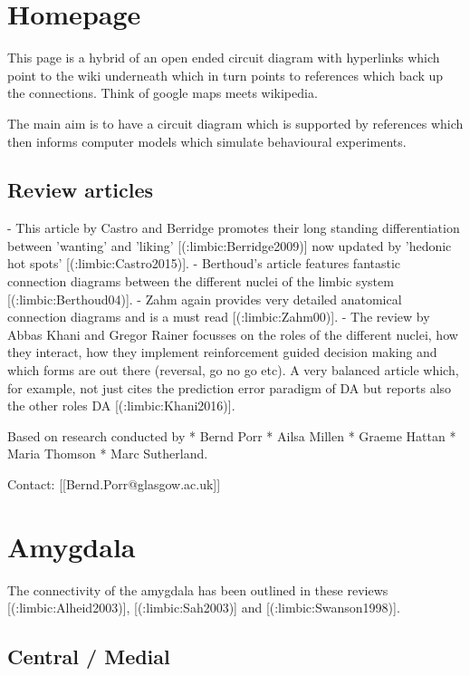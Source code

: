 \section{Homepage}

This page is a hybrid of an open ended circuit diagram with hyperlinks which point to the wiki underneath which in turn points to references which back up the connections. Think of google maps meets wikipedia.

The main aim is to have a circuit diagram which is supported by references which then informs computer models which simulate behavioural experiments.





\subsection{Review articles}
  - This article by Castro and Berridge promotes their long standing differentiation between 'wanting' and 'liking' [(:limbic:Berridge2009)] now updated by 'hedonic hot spots' [(:limbic:Castro2015)].
  - Berthoud's article features fantastic connection diagrams between the different nuclei of the limbic system [(:limbic:Berthoud04)].
  - Zahm again provides very detailed anatomical connection diagrams and is a must read [(:limbic:Zahm00)].
  - The review by  Abbas Khani and Gregor Rainer focusses on the roles of the different nuclei, how they interact, how they implement reinforcement guided decision making and which forms are out there (reversal, go no go etc). A very balanced article which, for example, not just cites the prediction error paradigm of DA but reports also the other roles DA [(:limbic:Khani2016)].

Based on research conducted by 
  * Bernd Porr
  * Ailsa Millen
  * Graeme Hattan
  * Maria Thomson
  * Marc Sutherland.

Contact: [[Bernd.Porr@glasgow.ac.uk]]




\section{Amygdala}

The connectivity of the amygdala has been outlined in these reviews [(:limbic:Alheid2003)], [(:limbic:Sah2003)] and [(:limbic:Swanson1998)].

\subsection{Central / Medial}


